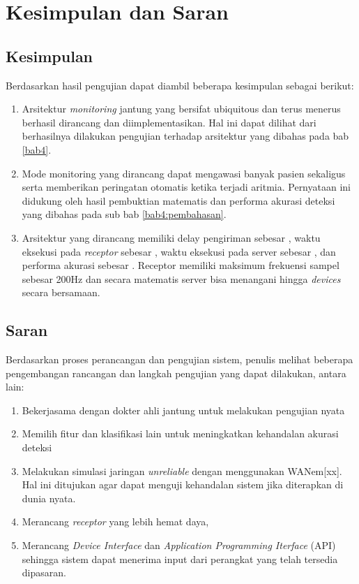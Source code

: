 \chapter{Kesimpulan dan Saran}
\section{Kesimpulan}
Berdasarkan hasil pengujian dapat diambil beberapa kesimpulan sebagai berikut:

\begin{enumerate}
	\item Arsitektur \textit{monitoring} jantung yang bersifat ubiquitous dan terus menerus berhasil dirancang dan diimplementasikan. Hal ini dapat dilihat dari berhasilnya dilakukan pengujian terhadap arsitektur yang dibahas pada bab \ref{bab4}.
	\item Mode monitoring yang dirancang dapat mengawasi banyak pasien sekaligus serta memberikan peringatan otomatis ketika terjadi aritmia. Pernyataan ini didukung oleh hasil pembuktian matematis dan performa akurasi deteksi yang dibahas pada sub bab \ref{bab4:pembahasan}.
	\item Arsitektur yang dirancang memiliki delay pengiriman sebesar \delay, waktu eksekusi pada \textit{receptor} sebesar \exec, waktu eksekusi pada server sebesar \execs, dan performa akurasi sebesar \accuracy. Receptor memiliki maksimum frekuensi sampel sebesar 200Hz dan secara matematis server bisa menangani hingga \sensor \textit{devices} secara bersamaan.
\end{enumerate}

\section{Saran}
Berdasarkan proses perancangan dan pengujian sistem, penulis melihat beberapa pengembangan rancangan dan langkah pengujian yang dapat dilakukan, antara lain:
\begin{enumerate}
	\item Bekerjasama dengan dokter ahli jantung untuk melakukan pengujian nyata
	\item Memilih fitur dan klasifikasi lain untuk meningkatkan kehandalan akurasi deteksi	
	\item Melakukan simulasi jaringan \textit{unreliable} dengan menggunakan WANem[xx]. Hal ini ditujukan agar dapat menguji kehandalan sistem jika diterapkan di dunia nyata.
	\item Merancang \textit{receptor} yang lebih hemat daya,
	\item Merancang \textit{Device Interface} dan \textit{Application Programming Iterface} (API) sehingga sistem dapat menerima input dari perangkat yang telah tersedia dipasaran.
\end{enumerate}